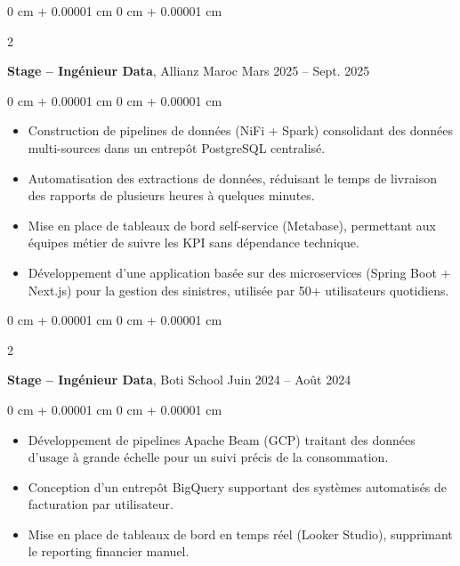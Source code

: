 \documentclass[10pt, letterpaper]{article}
\newenvironment{highlights}{
    \begin{itemize}[
        topsep=0.10 cm,
        parsep=0.10 cm,
        partopsep=0pt,
        itemsep=0pt,
        leftmargin=0 cm + 10pt
    ]
}{
    \end{itemize}
} %
\newenvironment{onecolentry}{
    \begin{adjustwidth}{
        0 cm + 0.00001 cm
    }{
        0 cm + 0.00001 cm
    }
}{
    \end{adjustwidth}
} %
\newenvironment{twocolentry}[2][]{
    \onecolentry
    \def\secondColumn{#2}
    \setcolumnwidth{\fill, 4.5 cm}
    \begin{paracol}{2}
}{
    \switchcolumn \raggedleft \secondColumn
    \end{paracol}
    \endonecolentry
} %
\begin{document}
        \vspace{0.2 cm}
        
        \begin{twocolentry}{
            Mars 2025 – Sept. 2025
        }
            \textbf{Stage – Ingénieur Data}, Allianz Maroc \end{twocolentry}

        \vspace{0.10 cm}
        \begin{onecolentry}
            \begin{highlights}
\item Construction de pipelines de données (NiFi + Spark) consolidant des données multi-sources dans un entrepôt PostgreSQL centralisé.
    \item Automatisation des extractions de données, réduisant le temps de livraison des rapports de plusieurs heures à quelques minutes.
    \item Mise en place de tableaux de bord self-service (Metabase), permettant aux équipes métier de suivre les KPI sans dépendance technique.
    \item Développement d’une application basée sur des microservices (Spring Boot + Next.js) pour la gestion des sinistres, utilisée par 50+ utilisateurs quotidiens.

            \end{highlights}
        \end{onecolentry}


        \vspace{0.2 cm}
        
        \begin{twocolentry}{
            Juin 2024 – Août 2024
        }
            \textbf{Stage – Ingénieur Data}, Boti School \end{twocolentry}

        \vspace{0.10 cm}
        \begin{onecolentry}
            \begin{highlights}
\item Développement de pipelines Apache Beam (GCP) traitant des données d’usage à grande échelle pour un suivi précis de la consommation.
    \item Conception d’un entrepôt BigQuery supportant des systèmes automatisés de facturation par utilisateur.
    \item Mise en place de tableaux de bord en temps réel (Looker Studio), supprimant le reporting financier manuel.
            \end{highlights}
        \end{onecolentry}
\end{document}
